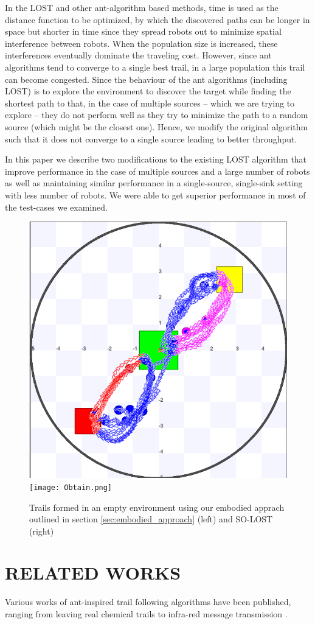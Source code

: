 \documentclass[letterpaper, 10 pt, conference]{ieeeconf}  %
\begin{document}
In the LOST and other ant-algorithm based methods, time is used as the distance function to be optimized, by which the discovered paths can be longer in space but shorter in time since they spread robots out to minimize spatial interference between robots. When the population size is increased, these interferences eventually dominate the traveling cost. However, since ant algorithms tend to converge to a single best trail, in a large population this trail can become congested. Since the behaviour of the ant algorithms (including LOST) is to explore the environment to discover the target while finding the shortest path to that, in the case of multiple sources -- which we are trying to explore -- they do not perform well as they try to minimize the path to a random source (which might be the closest one). Hence, we modify the original algorithm such that it does not converge to a single source leading to better throughput.

In this paper we describe two modifications to the existing LOST algorithm that improve performance in the case of multiple sources and a large number of robots as well as maintaining similar performance in a single-source, single-sink setting with less number of robots. We were able to get superior performance in most of the test-cases we examined.

\begin{figure}
   \includegraphics[width=0.49\linewidth]{embodied.png}
   \texttt{[image: Obtain.png]}
   \centering
   \caption{Trails formed in an empty environment using our embodied apprach outlined in section \ref{sec:embodied_approach} (left) and SO-LOST (right)}
   \label{fig:grid_visualization}
\end{figure}

\section{RELATED WORKS}
Various works of ant-inspired trail following algorithms have been published, ranging from leaving real chemical trails \cite{RussellOdour1994} to infra-red message transmission \cite{payton2001pheromone}. 
\end{document}
